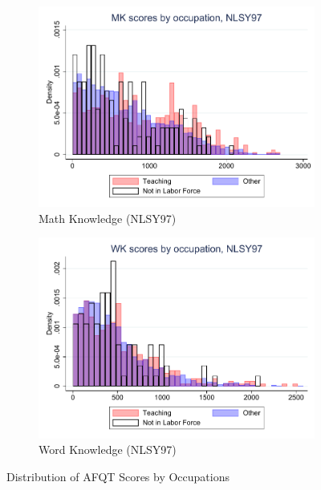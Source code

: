 \documentclass[onehalfspacing,11pt]{article}
\begin{document}
\begin{figure}
\begin{subfigure}{0.49\textwidth}
		\includegraphics[width=\linewidth]{NLSY97_MK_occ.pdf}
		\caption{Math Knowledge (NLSY97)} \label{fig:nlsy97math}
	\end{subfigure}
	\hspace*{\fill} %
	\begin{subfigure}{0.49\textwidth}
		\includegraphics[width=\linewidth]{NLSY97_WK_occ.pdf}
		\caption{Word Knowledge (NLSY97)} \label{fig:nlsy97wprd}
	\end{subfigure}

	\caption{Distribution of AFQT Scores by Occupations}
	\label{fig:nlsy_by_occ}
\end{figure}

\end{document}
